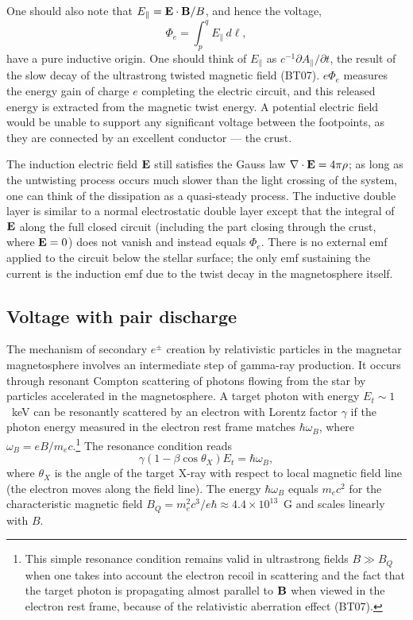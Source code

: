 One should also note that $E_\parallel={\mathbf E}\cdot{\mathbf B}/B$, and hence the voltage,
\begin{equation}
\label{eq:phi_e}
  \Phi_{e} = \int_p^{q} E_\parallel\,d\ell,
\end{equation}
have a pure inductive origin. One should think of
$E_\parallel$ as $c^{-1}\partial A_\parallel/\partial t$, the result of the slow decay
of the ultrastrong twisted magnetic field (BT07).
$e\Phi_e$ measures the energy gain of charge $e$ completing the electric circuit,
and this released energy is extracted from the magnetic twist energy.
A potential electric field would be unable to support any significant voltage
between the footpoints, as they are connected by an excellent conductor --- the crust.

The induction electric field ${\mathbf E}$ still satisfies the Gauss law $\nabla\cdot{\mathbf E}=4\pi \rho$;
as long as the untwisting process occurs much slower than the light crossing of
the system, one can think of the dissipation as a quasi-steady process. The inductive
double layer is similar to a normal electrostatic double layer except that
the integral of ${\mathbf E}$ along the full closed circuit (including the part
closing through the crust, where ${\mathbf E}=0$) does not vanish and instead equals $\Phi_e$.
There is no external emf applied to the circuit below the stellar surface; the only emf
sustaining the current is the induction emf due to the twist decay in the magnetosphere
itself.



\subsection{Voltage with pair discharge}
\label{sec:v-with-pair}

The mechanism of secondary $e^\pm$ creation by relativistic particles in the
magnetar magnetosphere  involves an intermediate step of gamma-ray production.
It occurs through resonant Compton scattering of photons flowing from the star
by particles accelerated in the magnetosphere. A target photon with energy
$E_t\sim 1$~keV can be resonantly scattered by an electron with Lorentz factor
$\gamma$ if the photon energy measured in the electron rest frame matches $\hbar\omega_B$,
where $\omega_B=eB/m_ec$.\footnote{This simple resonance condition remains
   valid in ultrastrong fields $B\gg B_Q$ when one takes into account the electron recoil
   in scattering and the fact
   that
   the target photon is propagating almost parallel to ${\mathbf B}$
   when viewed in the electron rest frame, because of the relativistic aberration effect (BT07).}
The resonance condition reads
\begin{equation}
  \label{eq:9}
  \gamma(1 - \beta\cos\theta_X)E_t = \hbar\omega_B,
\end{equation}
where $\theta_X$ is the angle of the target X-ray with respect to local magnetic
field line (the electron moves along the field line). The energy $\hbar\omega_B$
equals $m_ec^2$ for the characteristic magnetic field
$B_Q=m_e^2c^3/e\hbar\approx 4.4\times 10^{13}$~G and scales linearly with $B$.

